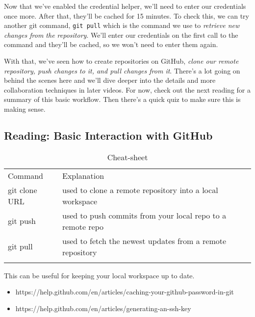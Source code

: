 Now that we've enabled the credential helper, we'll need to enter our credentials once more. After that, they'll be cached for 15 minutes. To check this, we can try another git command, \verb|git pull| which is the command we use to \textit{retrieve new changes from the repository}. We'll enter our credentials on the first call to the command and they'll be cached, so we won't need to enter them again.

With that, we've seen how to create repositories on GitHub, \textit{clone our remote repository, push changes to it, and pull changes from it}. There's a lot going on behind the scenes here and we'll dive deeper into the details and more collaboration techniques in later videos. For now, check out the next reading for a summary of this basic workflow. Then there's a quick quiz to make sure this is making sense.


\subsection{Reading: Basic Interaction with GitHub} \label{W301d}

\begin{table}
	\caption{Cheat-sheet}
	\label{tab:W301d}       %
	\begin{tabular}{p{3cm}p{8cm}}
		\hline\noalign{\smallskip}
		Command & Explanation \\
		\noalign{\smallskip}\svhline\noalign{\smallskip}
		git clone URL & used to clone a remote repository into a local workspace \\
		git push & used to push commits from your local repo to a remote repo \\
		git pull & used to fetch the newest updates from a remote repository \\
		\noalign{\smallskip}\hline\noalign{\smallskip}
	\end{tabular}
\end{table}
%
This can be useful for keeping your local workspace up to date.

\begin{itemize}
	\item https://help.github.com/en/articles/caching-your-github-password-in-git

	\item https://help.github.com/en/articles/generating-an-ssh-key  
	
\end{itemize}

